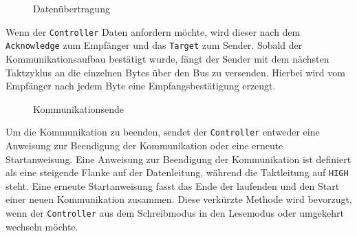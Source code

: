 \begin{wrapfigure}{r}{.4\textwidth}
	\centering
	\scalebox{1.25}{}
	
	\caption{Datenübertragung}
	\label{i2c-data}
\end{wrapfigure}
Wenn der \texttt{Controller} Daten anfordern möchte, wird dieser nach dem \texttt{Acknowledge} zum Empfänger und das \texttt{Target} zum Sender.
Sobald der Kommunikationsaufbau bestätigt wurde, fängt der Sender mit dem nächsten Taktzyklus an die einzelnen Bytes über den Bus zu versenden.
Hierbei wird vom Empfänger nach jedem Byte eine Empfangsbestätigung erzeugt.

\begin{wrapfigure}{r}{.4\textwidth}
	\centering
	\scalebox{1.25}{}
	\scalebox{1.25}{}
	
	\caption{Kommunikationsende}
	\label{i2c-stop}
\end{wrapfigure}
Um die Kommunikation zu beenden, sendet der \texttt{Controller} entweder eine Anweisung zur Beendigung der Kommunikation oder eine erneute Startanweisung.
Eine Anweisung zur Beendigung der Kommunikation ist definiert als eine steigende Flanke auf der Datenleitung, während die Taktleitung auf \texttt{HIGH} steht.
Eine erneute Startanweisung fasst das Ende der laufenden und den Start einer neuen Kommunikation zusammen.
Diese verkürzte Methode wird bevorzugt, wenn der \texttt{Controller} aus dem Schreibmodus in den Lesemodus oder umgekehrt wechseln möchte.

\cite{I2C-spec_userManual}
